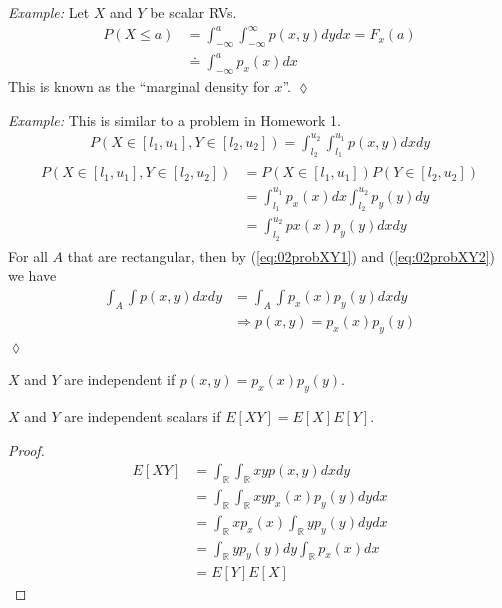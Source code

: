 \documentclass[lecture,12pt,]{pcms-l}
\begin{document}
\textit{Example:} Let $X$ and $Y$ be scalar RVs.
\begin{align*}
P(X\leq a) &= \int_{-\infty}^a \int_{-\infty}^\infty p(x,y)dydx = F_x(a) \\
&\doteq \int_{-\infty}^a p_x(x)dx
\end{align*}
This is known as the ``marginal density for $x$''.
$\lozenge$

\textit{Example:} This is similar to a problem in Homework 1.
\begin{align}
\label{eq:02probXY1}
P(X\in[l_1,u_1], Y\in[l_2,u_2]) = \int_{l_2}^{u_2} \int_{l_1}^{u_1} p(x,y)dxdy
\end{align}
\begin{align}
\label{eq:02probXY2}
\begin{split}
P(X\in[l_1,u_1], Y\in[l_2,u_2]) &= P(X\in[l_1,u_1]) P(Y\in[l_2,u_2]) \\
&= \int_{l_1}^{u_1}p_x(x)dx \int_{l_2}^{u_2}p_y(y)dy \\
&= \int_{l_2}^{u_2}px(x)p_y(y)dxdy
\end{split}
\end{align}
For all $A$ that are rectangular, then by (\ref{eq:02probXY1}) and (\ref{eq:02probXY2}) we have
\begin{align*}
\int_A\int p(x,y)dxdy &= \int_A\int p_x(x)p_y(y)dxdy \\
&\Rightarrow p(x,y) = p_x(x)p_y(y)
\end{align*}
$\lozenge$

\begin{theorem}
$X$ and $Y$ are independent if $p(x,y) = p_x(x)p_y(y)$.
\end{theorem}

\begin{theorem}
$X$ and $Y$ are independent scalars if $E[XY] = E[X]E[Y]$.
\end{theorem}

\begin{proof}
\begin{align*}
E[XY] &= \int_\mathbb{R}\int_\mathbb{R} xyp(x,y)dxdy \\
&= \int_\mathbb{R}\int_\mathbb{R} xyp_x(x)p_y(y)dydx \\
&= \int_\mathbb{R} xp_x(x)\int_\mathbb{R} yp_y(y)dydx \\
&= \int_\mathbb{R} yp_y(y)dy \int_\mathbb{R} p_x(x)dx \\
&= E[Y]E[X]
\end{align*}
\end{proof}
\end{document}

